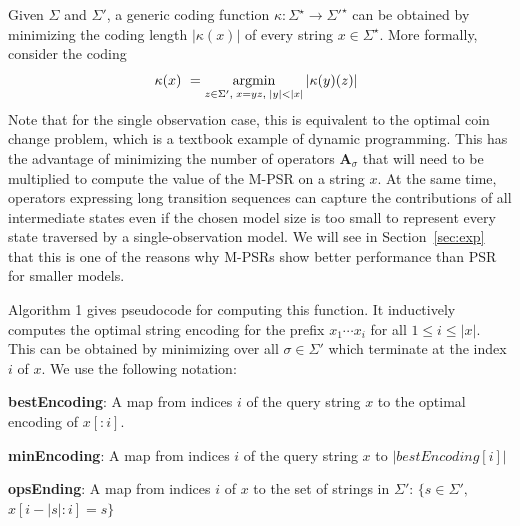 \documentclass[letterpaper]{article}
\newcommand{\mat}[1]{\mathbf{#1}}
\newcommand{\A}{\mat{A}}
\newcommand{\sstar}{\Sigma^\star}
\DeclareMathOperator*{\argmin}{\rm argmin}
\begin{document}
Given $\Sigma$ and $\Sigma'$, a generic coding function $\kappa : \sstar \to {\Sigma'}^\star$ can be obtained by minimizing the coding length $|\kappa(x)|$ of every string $x \in \sstar$. More formally, consider the coding
\begin{equation*}
\kappa(x) ~= \argmin_{ z \in \Sigma', \; x=yz, \; |y|<|x|} |\kappa(y)(z)| \enspace 
\end{equation*}
Note that for the single observation case, this is equivalent to the optimal coin change problem, which is a textbook example of dynamic programming. This has the advantage of minimizing the number of operators $\A_\sigma$ that will need to be multiplied to compute the value of the M-PSR on a string $x$. At the same time, operators expressing long transition sequences can capture the contributions of all intermediate states even if the chosen model size is too small to represent every state traversed by a single-observation model. We will see in Section~\ref{sec:exp} that this is one of the reasons why M-PSRs show better performance than PSR for smaller models.




%

Algorithm 1 gives pseudocode for computing this function. It inductively computes the optimal string encoding for the prefix $x_1 \cdots x_i$ for all $1 \leq i \leq |x|$. This can be obtained by minimizing over all $\sigma \in \Sigma'$ which terminate at the index $i$ of $x$.
We use the following notation:

\textbf{bestEncoding}: A map from indices $i$ of the query string $x$ to the optimal encoding of $x[:i]$.

\textbf{minEncoding}: A map from indices $i$ of the query string $x$ to $|bestEncoding[i]|$

\textbf{opsEnding}: A map from indices $i$ of $x$ to the set of strings in $\Sigma'$: $\{s \in \Sigma',$ $x[i-|s|:i] = s\}$
\end{document}
